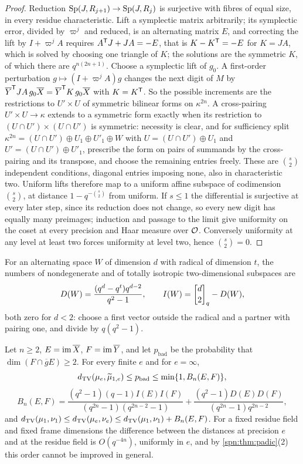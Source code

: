 \begin{proof}
Reduction $\operatorname{Sp}(J,R_{j+1})\to\operatorname{Sp}(J,R_j)$ is surjective with fibres of equal size, in every residue
characteristic. Lift a symplectic matrix arbitrarily; its symplectic error, divided by $\varpi^j$
and reduced, is an alternating matrix $E$, and correcting the lift by $I+\varpi^jA$ requires
$A^{\mathsf{T}}J+JA=-E$, that is $K-K^{\mathsf{T}}=-E$ for $K=JA$, which is solved by choosing one triangle of
$K$; the solutions are the symmetric $K$, of which there are $q^{n(2n+1)}$. Choose a symplectic lift
of $g_0$. A first-order perturbation $g\mapsto(I+\varpi^jA)g$ changes the next digit of $M$ by
$\overline Y^{\mathsf{T}}JA\,g_0\overline X=\overline Y^{\mathsf{T}}K\,g_0\overline X$ with $K=K^{\mathsf{T}}$. So
the possible increments are the restrictions to $U'\times U$ of symmetric bilinear forms on
$\kappa^{2n}$. A cross-pairing $U'\times U\to\kappa$ extends to a symmetric form exactly when its
restriction to $(U\cap U')\times(U\cap U')$ is symmetric: necessity is clear, and for sufficiency
split $\kappa^{2n}=(U\cap U')\oplus U_1\oplus U'_1\oplus W$ with $U=(U\cap U')\oplus U_1$ and
$U'=(U\cap U')\oplus U'_1$, prescribe the form on pairs of summands by the cross-pairing and its
transpose, and choose the remaining entries freely. These are $\binom s2$ independent conditions,
diagonal entries imposing none, also in characteristic two. Uniform lifts therefore map to a
uniform affine subspace of codimension $\binom s2$, at distance $1-q^{-\binom s2}$ from uniform. If
$s\le1$ the differential is surjective at every later step, since its reduction does not change,
so every new digit has equally many preimages; induction and passage to the limit give uniformity
on the coset at every precision and Haar measure over $\mathcal{O}$. Conversely uniformity at any level at
least two forces uniformity at level two, hence $\binom s2=0$.
\end{proof}

For an alternating space $W$ of dimension $d$ with radical of dimension $t$, the numbers of
nondegenerate and of totally isotropic two-dimensional subspaces are
\[
 D(W)=\frac{(q^d-q^t)q^{d-2}}{q^2-1},\qquad I(W)=\spnqbin d2q-D(W),
\]
both zero for $d<2$: choose a first vector outside the radical and a partner with pairing one,
and divide by $q(q^2-1)$.

\begin{theorem}\label{spn:thm:padic-lifting}
Let $n\ge2$, $E=\operatorname{im}\overline X$, $F=\operatorname{im}\overline Y$, and let $p_{\mathrm{bad}}$ be the
probability that $\dim(F\cap\overline gE)\ge2$. For every finite $e$ and for $e=\infty$,
\[
 d_{\mathrm{TV}}(\mu_e,\widetilde\mu_{1,e})\le p_{\mathrm{bad}}\le\min\{1,B_n(E,F)\},
\]
\[
 B_n(E,F)=\frac{(q^2-1)(q-1)I(E)I(F)}{(q^{2n}-1)(q^{2n-2}-1)}+\frac{(q^2-1)D(E)D(F)}{(q^{2n}-1)q^{2n-2}},
\]
and
$d_{\mathrm{TV}}(\mu_1,\nu_1)\le d_{\mathrm{TV}}(\mu_e,\nu_e)\le d_{\mathrm{TV}}(\mu_1,\nu_1)+B_n(E,F)$. For a fixed residue
field and fixed frame dimensions the difference between the distances at precision $e$ and at the
residue field is $O(q^{-4n})$, uniformly in $e$, and by \cref{spn:thm:padic}(2) this order cannot
be improved in general.
\end{theorem}

